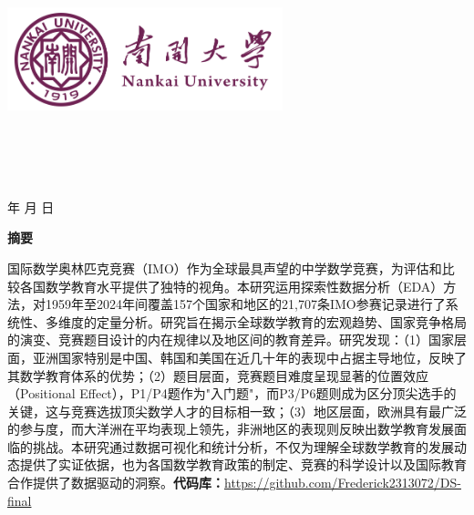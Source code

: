 \documentclass[12pt,a4paper]{article}
\begin{document}
\renewcommand{\contentsname}{目录}
\renewcommand{\appendixname}{附录}
\renewcommand{\appendixpagename}{附录}
\renewcommand{\refname}{参考文献} 
\renewcommand{\figurename}{图}
\renewcommand{\tablename}{表}
\renewcommand{\abstractname}{摘要}
\renewcommand{\today}{\number\year 年 \number\month 月 \number\day 日}

\renewcommand {\thefigure}{\thesection{}.\arabic{figure}}%
\renewcommand{\figurename}{图}
\renewcommand{\contentsname}{目录}  

\begin{titlepage}
    \begin{center}
    \includegraphics[width=0.6\textwidth]{NKU.png}\\[1cm]
    \vspace{20mm}
		\textbf{\huge\textbf{}}\\[0.5cm]
		\textbf{\huge{}}\\[2.3cm]

		\vspace{\fill}
    
    \centering
    \textsc{\LARGE {}}\\[0.5cm]
    \textsc{\LARGE {}}\\[0.5cm]
    \vfill
    {\Large \today}
    \end{center}
\end{titlepage}

\clearpage
{} %
\begin{center}
    {\songti\bfseries 摘\quad 要}
\end{center}
\vspace{0.5em}
\small

国际数学奥林匹克竞赛（IMO）作为全球最具声望的中学数学竞赛，为评估和比较各国数学教育水平提供了独特的视角。本研究运用探索性数据分析（EDA）方法，对1959年至2024年间覆盖157个国家和地区的21,707条IMO参赛记录进行了系统性、多维度的定量分析。研究旨在揭示全球数学教育的宏观趋势、国家竞争格局的演变、竞赛题目设计的内在规律以及地区间的教育差异。研究发现：（1）国家层面，亚洲国家特别是中国、韩国和美国在近几十年的表现中占据主导地位，反映了其数学教育体系的优势；（2）题目层面，竞赛题目难度呈现显著的位置效应（Positional Effect），P1/P4题作为"入门题"，而P3/P6题则成为区分顶尖选手的关键，这与竞赛选拔顶尖数学人才的目标相一致；（3）地区层面，欧洲具有最广泛的参与度，而大洋洲在平均表现上领先，非洲地区的表现则反映出数学教育发展面临的挑战。本研究通过数据可视化和统计分析，不仅为理解全球数学教育的发展动态提供了实证依据，也为各国数学教育政策的制定、竞赛的科学设计以及国际教育合作提供了数据驱动的洞察。\textbf{代码库：}\url{https://github.com/Frederick2313072/DS-final}
\end{document}
